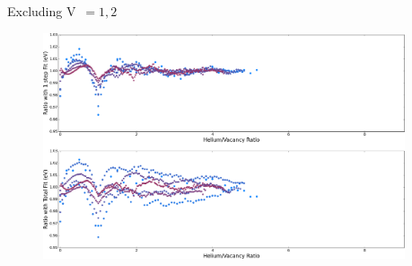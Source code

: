 \documentclass[10pt]{beamer}
\begin{document}
\begin{frame}{Excluding V~$=1, 2$}
	\begin{figure}
        \includegraphics[width=0.95\textwidth]{ratioEX}
    \end{figure}
\end{frame}

% 
%     	
\end{document}
